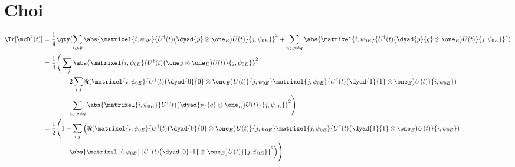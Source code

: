 \section{Choi}
\begin{align}
\label{eq:appendix:A:1}
\Tr[\mcD^2(t)] &= 
\frac{1}{4}
\qty(
\sum_{i,j,p}
\abs{\matrixel{i, \psi_{0E}}
{U^\dagger(t) \big(\dyad{p} \otimes \one_E\big) U(t)}
{j, \psi_{0E}}
}^2 +
\sum_{i,j,p\ne q}
\abs{\matrixel{i, \psi_{0E}}
{U^\dagger(t) \big(\dyad{p}{q} \otimes \one_E\big) U(t)}
{j, \psi_{0E}}
}^2
) \\
\label{eq:appendix:A:2}
&= 
\frac{1}{4}
\Bigg(
\sum_{i,j}
\abs{\matrixel{i, \psi_{0E}}
{U^\dagger(t) \big(\one_S \otimes \one_E\big) U(t)}
{j, \psi_{0E}}
}^2 
\nonumber \\
&\hspace*{10mm}
- 2 \sum_{i,j}
\Re(
\matrixel{i, \psi_{0E}}
{U^\dagger(t) \big(\dyad{0}{0} \otimes \one_E\big) U(t)}
{j, \psi_{0E}}
\matrixel{j, \psi_{0E}}
{U^\dagger(t) \big(\dyad{1}{1} \otimes \one_E\big) U(t)}
{i, \psi_{0E}}
)
\nonumber \\
& \hspace*{10mm}
+ \sum_{i,j,p\ne q}
\abs{\matrixel{i, \psi_{0E}}
{U^\dagger(t) \big(\dyad{p}{q} \otimes \one_E\big) U(t)}
{j, \psi_{0E}}
}^2
\Bigg) \\
&= 
\frac{1}{2} 
\Bigg(
1 - 
\sum_{i,j}
\Big( \Re(
\matrixel{i, \psi_{0E}}
{U^\dagger(t) \big(\dyad{0}{0} \otimes \one_E\big) U(t)}
{j, \psi_{0E}}
\matrixel{j, \psi_{0E}}
{U^\dagger(t) \big(\dyad{1}{1} \otimes \one_E\big) U(t)}
{i, \psi_{0E}}
)
\nonumber \\
& \hspace*{10mm}
+
\abs{\matrixel{i, \psi_{0E}}
{U^\dagger(t) \big(\dyad{0}{1} \otimes \one_E\big) U(t)}
{j, \psi_{0E}}
}^2
\Big)
\Bigg)
\end{align}


